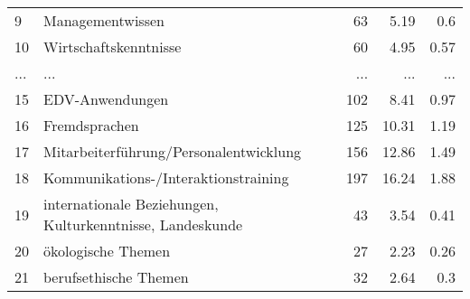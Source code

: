 \begin{longtable}{lXrrr}
        9 & \multicolumn{1}{X}{Managementwissen} & %
          \num{63} &
          \num[round-mode=places,round-precision=2]{5,19} &
          \num[round-mode=places,round-precision=2]{0,6} \\
        10 & \multicolumn{1}{X}{Wirtschaftskenntnisse} & %
          \num{60} &
          \num[round-mode=places,round-precision=2]{4,95} &
          \num[round-mode=places,round-precision=2]{0,57} \\
       ... & ... & ... & ... & ... \\
        15 & \multicolumn{1}{X}{EDV-Anwendungen} & %
          \num{102} &
          \num[round-mode=places,round-precision=2]{8,41} &
          \num[round-mode=places,round-precision=2]{0,97} \\

        16 & \multicolumn{1}{X}{Fremdsprachen} & %
          \num{125} &
          \num[round-mode=places,round-precision=2]{10,31} &
          \num[round-mode=places,round-precision=2]{1,19} \\

        17 & \multicolumn{1}{X}{Mitarbeiterführung/Personalentwicklung} & %
          \num{156} &
          \num[round-mode=places,round-precision=2]{12,86} &
          \num[round-mode=places,round-precision=2]{1,49} \\

        18 & \multicolumn{1}{X}{Kommunikations-/Interaktionstraining} & %
          \num{197} &
          \num[round-mode=places,round-precision=2]{16,24} &
          \num[round-mode=places,round-precision=2]{1,88} \\

        19 & \multicolumn{1}{X}{internationale Beziehungen, Kulturkenntnisse, Landeskunde} & %
          \num{43} &
          \num[round-mode=places,round-precision=2]{3,54} &
          \num[round-mode=places,round-precision=2]{0,41} \\

        20 & \multicolumn{1}{X}{ökologische Themen} & %
          \num{27} &
          \num[round-mode=places,round-precision=2]{2,23} &
          \num[round-mode=places,round-precision=2]{0,26} \\

        21 & \multicolumn{1}{X}{berufsethische Themen} & %
          \num{32} &
          \num[round-mode=places,round-precision=2]{2,64} &
          \num[round-mode=places,round-precision=2]{0,3} \\


\end{longtable}
